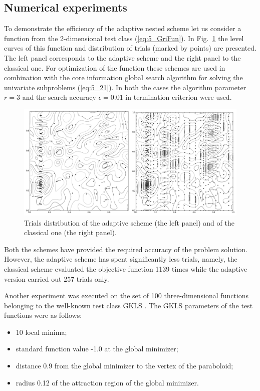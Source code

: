 \subsection {Numerical experiments}
\label{subsec:5_4_2}
To demonstrate the efficiency of the adaptive nested scheme let us consider a function from the 2-dimensional test class (\ref{eq:5_GriFun}). In Fig.~\ref{fig:5_10} the level curves of this function and distribution of trials (marked by points) are presented. The left panel corresponds to the adaptive scheme and the right panel to the classical one. For optimization of the function these schemes are used in combination with the core information global search algorithm \cite{5_GriKvaMukhStr, 5_StrSergMon2000} for solving the univariate subproblems (\ref{eq:5_21}). In both the cases the algorithm parameter $r=3$  and the search accuracy $\epsilon=0.01$ in termination criterion were used.
\begin{figure}[ht]
\centering
\includegraphics[width=1.0\linewidth]{figures/figure_5_10.png}
\caption{Trials distribution of the adaptive scheme (the left panel) and of the classical one (the right panel).}
\label{fig:5_10}    
\end{figure}

Both the schemes have provided the required accuracy of the problem solution. However, the adaptive scheme has spent significantly less trials, namely, the classical scheme evaluated the objective function 1139 times while the adaptive version carried out 257 trials only.

Another experiment was executed \cite{5_GriIsrSergAMC} on the set of 100 three-dimensional functions belonging to the well-known test class GKLS \cite{5_GavianoKvasovLeraSergeyev}. The GKLS parameters of the test functions were as follows:
\begin{itemize}
\item {10 local minima;}
\item {standard function value -1.0 at the  global minimizer;}
\item{distance 0.9 from the global minimizer to the vertex of the paraboloid;}
\item{radius 0.12 of the attraction region of the global minimizer.}
\end{itemize}

